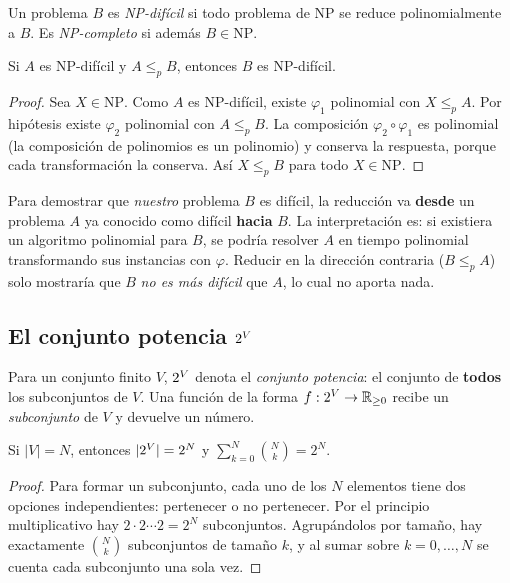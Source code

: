 \begin{definicion}
Un problema $B$ es \emph{NP-difícil} si todo problema de NP se reduce polinomialmente a $B$. Es \emph{NP-completo} si además $B \in \mathrm{NP}$.
\end{definicion}

\begin{teorema}\label{teo:herramienta}
Si $A$ es NP-difícil y $A \le_p B$, entonces $B$ es NP-difícil.
\end{teorema}
\begin{proof}
Sea $X \in \mathrm{NP}$. Como $A$ es NP-difícil, existe $\varphi_1$ polinomial con $X \le_p A$. Por hipótesis existe $\varphi_2$ polinomial con $A \le_p B$. La composición $\varphi_2 \circ \varphi_1$ es polinomial (la composición de polinomios es un polinomio) y conserva la respuesta, porque cada transformación la conserva. Así $X \le_p B$ para todo $X\in\mathrm{NP}$.
\end{proof}

\begin{observacion}
Para demostrar que \emph{nuestro} problema $B$ es difícil, la reducción va \textbf{desde} un problema $A$ ya conocido como difícil \textbf{hacia} $B$. La interpretación es: si existiera un algoritmo polinomial para $B$, se podría resolver $A$ en tiempo polinomial transformando sus instancias con $\varphi$. Reducir en la dirección contraria ($B \le_p A$) solo mostraría que $B$ \emph{no es más difícil} que $A$, lo cual no aporta nada.
\end{observacion}

\subsection{El conjunto potencia \texorpdfstring{$2^{V}$}{2\^{}V}}

Para un conjunto finito $V$, $2^{V}$ denota el \emph{conjunto potencia}: el conjunto de \textbf{todos} los subconjuntos de $V$. Una función de la forma $f:2^{V}\to\mathbb{R}_{\ge 0}$ recibe un \emph{subconjunto} de $V$ y devuelve un número.

\begin{lema}\label{lem:potencia}
Si $|V| = N$, entonces $|2^{V}| = 2^N$ y $\displaystyle\sum_{k=0}^{N}\binom{N}{k} = 2^N$.
\end{lema}
\begin{proof}
Para formar un subconjunto, cada uno de los $N$ elementos tiene dos opciones independientes: pertenecer o no pertenecer. Por el principio multiplicativo hay $2\cdot 2\cdots 2 = 2^N$ subconjuntos. Agrupándolos por tamaño, hay exactamente $\binom{N}{k}$ subconjuntos de tamaño $k$, y al sumar sobre $k=0,\dots,N$ se cuenta cada subconjunto una sola vez.
\end{proof}

